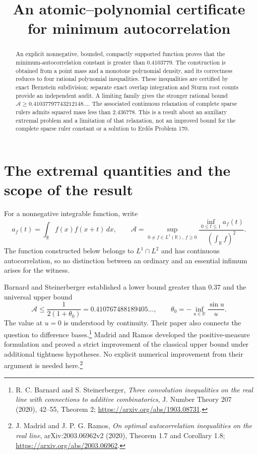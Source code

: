 \documentclass[11pt,a4paper]{article}
\title{An atomic--polynomial certificate for minimum autocorrelation}
\author{}\date{}
\theoremstyle{remark}\newtheorem{remark}[theorem]{Remark}
\newcommand{\R}{\mathbb R}
\begin{document}
\maketitle
\vspace{-12mm}
\begin{abstract}
An explicit nonnegative, bounded, compactly supported function proves that the minimum-autocorrelation constant is greater than $0.4103779$. The construction is obtained from a point mass and a monotone polynomial density, and its correctness reduces to four rational polynomial inequalities. These inequalities are certified by exact Bernstein subdivision; separate exact overlap integration and Sturm root counts provide an independent audit. A limiting family gives the stronger rational bound $\mathcal A\ge 0.41037797743212148\ldots$. The associated continuous relaxation of complete sparse rulers admits squared mass less than $2.436778$. This is a result about an auxiliary extremal problem and a limitation of that relaxation, not an improved bound for the complete sparse ruler constant or a solution to Erd\H{o}s Problem 170.
\end{abstract}

\section{The extremal quantities and the scope of the result}
For a nonnegative integrable function, write
\[
 a_f(t)=\int_{\R}f(x)f(x+t)\,dx,
 \qquad
 \mathcal A=\sup_{0\ne f\in L^1(\R),\ f\ge0}
 \frac{\inf_{0\le t\le1}a_f(t)}{\left(\int_{\R}f\right)^2}.
\]
The function constructed below belongs to $L^1\cap L^2$ and has continuous autocorrelation, so no distinction between an ordinary and an essential infimum arises for the witness.

Barnard and Steinerberger established a lower bound greater than $0.37$ and the universal upper bound
\[
 \mathcal A\le\frac1{2(1+\theta_0)}
 =0.410767488189405\ldots,
 \qquad \theta_0=-\inf_{u\in\R}\frac{\sin u}{u}.
\]
The value at $u=0$ is understood by continuity. Their paper also connects the question to difference bases.\footnote{R. C. Barnard and S. Steinerberger, \emph{Three convolution inequalities on the real line with connections to additive combinatorics}, J. Number Theory 207 (2020), 42--55, Theorem 2; \url{https://arxiv.org/abs/1903.08731}.}
Madrid and Ramos developed the positive-measure formulation and proved a strict improvement of the classical upper bound under additional tightness hypotheses. No explicit numerical improvement from their argument is needed here.\footnote{J. Madrid and J. P. G. Ramos, \emph{On optimal autocorrelation inequalities on the real line}, arXiv:2003.06962v2 (2020), Theorem 1.7 and Corollary 1.8; \url{https://arxiv.org/abs/2003.06962}.}
\end{document}
